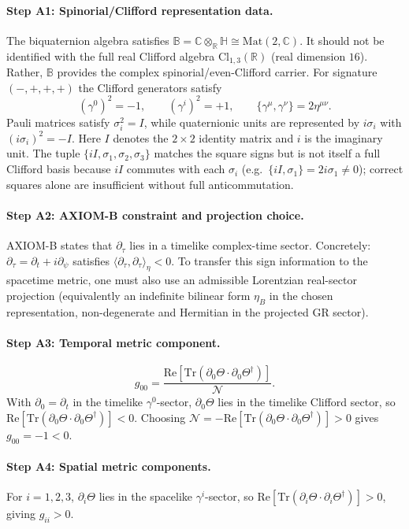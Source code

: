 \documentclass[12pt,a4paper]{article}
\theoremstyle{definition}
\theoremstyle{remark}
\newcommand{\BB}{\mathbb{B}}
\newcommand{\CC}{\mathbb{C}}
\newcommand{\RR}{\mathbb{R}}
\newcommand{\HH}{\mathbb{H}}
\newcommand{\Tr}{\mathrm{Tr}}
\newcommand{\re}{\mathrm{Re}}
\newcommand{\calN}{\mathcal{N}}
\begin{document}
\paragraph{Step A1: Spinorial/Clifford representation data.}
The biquaternion algebra satisfies
$\BB = \CC\otimes_\RR\HH \cong \mathrm{Mat}(2,\CC)$.
It should not be identified with the full real Clifford algebra
$\mathrm{Cl}_{1,3}(\RR)$ (real dimension $16$).
Rather, $\BB$ provides the complex spinorial/even-Clifford carrier.
For signature $(-,+,+,+)$ the Clifford generators satisfy
\[
  (\gamma^0)^2 = -1, \qquad
  (\gamma^i)^2 = +1, \qquad
  \{\gamma^\mu,\gamma^\nu\} = 2\eta^{\mu\nu}.
\]
Pauli matrices satisfy $\sigma_i^2 = I$, while quaternionic units are
represented by $i\sigma_i$ with $(i\sigma_i)^2=-I$.
Here $I$ denotes the $2\times2$ identity matrix and $i$ is the imaginary unit.
The tuple $\{iI,\sigma_1,\sigma_2,\sigma_3\}$ matches the square signs but is
not itself a full Clifford basis because $iI$ commutes with each $\sigma_i$
(e.g.\ $\{iI,\sigma_1\}=2i\sigma_1\neq0$);
correct squares alone are insufficient without full anticommutation.

\paragraph{Step A2: AXIOM-B constraint and projection choice.}
AXIOM-B states that $\partial_\tau$ lies in a timelike complex-time sector.
Concretely: $\partial_\tau = \partial_t + i\partial_\psi$ satisfies
$\langle\partial_\tau,\partial_\tau\rangle_\eta < 0$.
To transfer this sign information to the spacetime metric, one must also use
an admissible Lorentzian real-sector projection (equivalently an indefinite
bilinear form $\eta_B$ in the chosen representation, non-degenerate and
Hermitian in the projected GR sector).

\paragraph{Step A3: Temporal metric component.}
\[
  g_{00}
  = \frac{\re[\Tr(\partial_0\Theta \cdot \partial_0\Theta^\dagger)]}{\calN}.
\]
With $\partial_0 = \partial_t$ in the timelike $\gamma^0$-sector,
$\partial_0\Theta$ lies in the timelike Clifford sector, so
$\re[\Tr(\partial_0\Theta \cdot \partial_0\Theta^\dagger)] < 0$.
Choosing $\calN = -\re[\Tr(\partial_0\Theta \cdot \partial_0\Theta^\dagger)] > 0$
gives $g_{00} = -1 < 0$.

\paragraph{Step A4: Spatial metric components.}
For $i = 1,2,3$, $\partial_i\Theta$ lies in the spacelike $\gamma^i$-sector,
so $\re[\Tr(\partial_i\Theta \cdot \partial_i\Theta^\dagger)] > 0$,
giving $g_{ii} > 0$.
\end{document}
